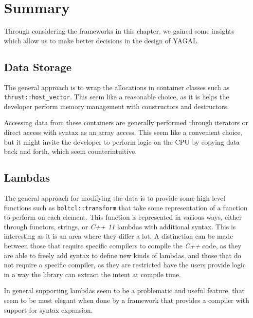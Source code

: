 \section{Summary}
Through considering the frameworks in this chapter, we gained some insights which allow us to make better decisions in the design of YAGAL.

\subsection{Data Storage}
The general approach is to wrap the allocations in container classes such as \texttt{thrust::host_vector}. This seem like a reasonable choice, as it is helps the developer perform memory management with constructors and destructors.

Accessing data from these containers are generally performed through iterators or direct access with syntax as an array access. This seem like a convenient choice, but it might invite the developer to perform logic on the CPU by copying data back and forth, which seem counterintuitive.

\subsection{Lambdas}
The general approach for modifying the data is to provide some high level functions such as \texttt{boltcl::transform} that take some representation of a function to perform on each element. This function is represented in various ways, either through functors, strings, or \textit{C++ 11} lambdas with additional syntax. This is interesting as it is an area where they differ a lot. A distinction can be made between those that require specific compilers to compile the \textit{C++} code, as they are able to freely add syntax to define new kinds of lambdas, and those that do not require a specific compiler, as they are restricted have the users provide logic in a way the library can extract the intent at compile time.

In general supporting lambdas seem to be a problematic and useful feature, that seem to be most elegant when done by a framework that provides a compiler with support for syntax expansion.